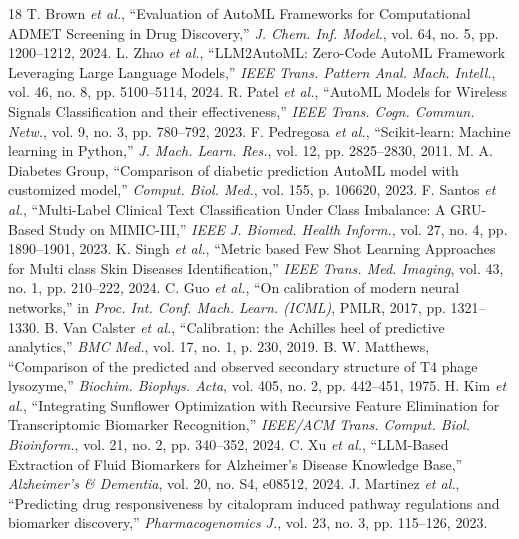 \documentclass[conference]{IEEEtran}
\begin{document}
\begin{thebibliography}{18}
 T. Brown \textit{et al.}, ``Evaluation of AutoML Frameworks for Computational ADMET Screening in Drug Discovery,'' \textit{J. Chem. Inf. Model.}, vol. 64, no. 5, pp. 1200--1212, 2024.
 L. Zhao \textit{et al.}, ``LLM2AutoML: Zero-Code AutoML Framework Leveraging Large Language Models,'' \textit{IEEE Trans. Pattern Anal. Mach. Intell.}, vol. 46, no. 8, pp. 5100--5114, 2024.
 R. Patel \textit{et al.}, ``AutoML Models for Wireless Signals Classification and their effectiveness,'' \textit{IEEE Trans. Cogn. Commun. Netw.}, vol. 9, no. 3, pp. 780--792, 2023.
 F. Pedregosa \textit{et al.}, ``Scikit-learn: Machine learning in Python,'' \textit{J. Mach. Learn. Res.}, vol. 12, pp. 2825--2830, 2011.
 M. A. Diabetes Group, ``Comparison of diabetic prediction AutoML model with customized model,'' \textit{Comput. Biol. Med.}, vol. 155, p. 106620, 2023.
 F. Santos \textit{et al.}, ``Multi-Label Clinical Text Classification Under Class Imbalance: A GRU-Based Study on MIMIC-III,'' \textit{IEEE J. Biomed. Health Inform.}, vol. 27, no. 4, pp. 1890--1901, 2023.
 K. Singh \textit{et al.}, ``Metric based Few Shot Learning Approaches for Multi class Skin Diseases Identification,'' \textit{IEEE Trans. Med. Imaging}, vol. 43, no. 1, pp. 210--222, 2024.
 C. Guo \textit{et al.}, ``On calibration of modern neural networks,'' in \textit{Proc. Int. Conf. Mach. Learn. (ICML)}, PMLR, 2017, pp. 1321--1330.
 B. Van Calster \textit{et al.}, ``Calibration: the Achilles heel of predictive analytics,'' \textit{BMC Med.}, vol. 17, no. 1, p. 230, 2019.
 B. W. Matthews, ``Comparison of the predicted and observed secondary structure of T4 phage lysozyme,'' \textit{Biochim. Biophys. Acta}, vol. 405, no. 2, pp. 442--451, 1975.
 H. Kim \textit{et al.}, ``Integrating Sunflower Optimization with Recursive Feature Elimination for Transcriptomic Biomarker Recognition,'' \textit{IEEE/ACM Trans. Comput. Biol. Bioinform.}, vol. 21, no. 2, pp. 340--352, 2024.
 C. Xu \textit{et al.}, ``LLM-Based Extraction of Fluid Biomarkers for Alzheimer's Disease Knowledge Base,'' \textit{Alzheimer's \& Dementia}, vol. 20, no. S4, e08512, 2024.
 J. Martinez \textit{et al.}, ``Predicting drug responsiveness by citalopram induced pathway regulations and biomarker discovery,'' \textit{Pharmacogenomics J.}, vol. 23, no. 3, pp. 115--126, 2023.

\end{thebibliography}
\end{document}
